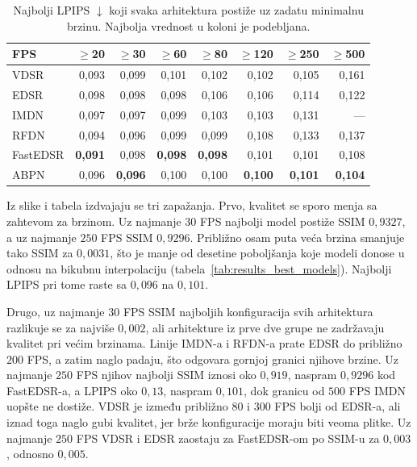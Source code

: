 \documentclass[12pt,a4paper]{article}
\begin{document}
\begin{table}[H]
	\centering
	\small
	\setlength{\tabcolsep}{8pt}
	\begin{tabular}{@{}lrrrrrrr@{}}
		\toprule
		FPS & $\geq$20 & $\geq$30 & $\geq$60 & $\geq$80 & $\geq$120 & $\geq$250 & $\geq$500 \\
		\midrule
		VDSR & 0,093 & 0,099 & 0,101 & 0,102 & 0,102 & 0,105 & 0,161 \\
		EDSR & 0,098 & 0,098 & 0,098 & 0,106 & 0,106 & 0,114 & 0,122 \\
		IMDN & 0,097 & 0,097 & 0,099 & 0,103 & 0,103 & 0,131 & --- \\
		RFDN & 0,094 & 0,096 & 0,099 & 0,099 & 0,108 & 0,133 & 0,137 \\
		FastEDSR & \textbf{0,091} & 0,098 & \textbf{0,098} & \textbf{0,098} & 0,101 & 0,101 & 0,108 \\
		ABPN & 0,096 & \textbf{0,096} & 0,100 & 0,100 & \textbf{0,100} & \textbf{0,101} & \textbf{0,104} \\
		\bottomrule
	\end{tabular}
	\caption{Najbolji LPIPS $\downarrow$ koji svaka arhitektura postiže uz zadatu minimalnu brzinu. Najbolja vrednost u koloni je podebljana.}
	\label{tab:fps_thr_LPIPS}
\end{table}

Iz slike i tabela izdvajaju se tri zapažanja. Prvo, kvalitet se sporo menja sa zahtevom za brzinom. Uz najmanje $30$ FPS najbolji model postiže SSIM $0{,}9327$, a uz najmanje $250$ FPS SSIM $0{,}9296$. Približno osam puta veća brzina smanjuje tako SSIM za $0{,}0031$, što je manje od desetine poboljšanja koje modeli donose u odnosu na bikubnu interpolaciju (tabela~\ref{tab:results_best_models}). Najbolji LPIPS pri tome raste sa $0{,}096$ na $0{,}101$.

Drugo, uz najmanje $30$ FPS SSIM najboljih konfiguracija svih arhitektura razlikuje se za najviše $0{,}002$, ali arhitekture iz prve dve grupe ne zadržavaju kvalitet pri većim brzinama. Linije IMDN-a i RFDN-a prate EDSR do približno $200$ FPS, a zatim naglo padaju, što odgovara gornjoj granici njihove brzine. Uz najmanje $250$ FPS njihov najbolji SSIM iznosi oko $0{,}919$, naspram $0{,}9296$ kod FastEDSR-a, a LPIPS oko $0{,}13$, naspram $0{,}101$, dok granicu od $500$ FPS IMDN uopšte ne dostiže. VDSR je između približno $80$ i $300$ FPS bolji od EDSR-a, ali iznad toga naglo gubi kvalitet, jer brže konfiguracije moraju biti veoma plitke. Uz najmanje $250$ FPS VDSR i EDSR zaostaju za FastEDSR-om po SSIM-u za $0{,}003$, odnosno $0{,}005$.
\end{document}
